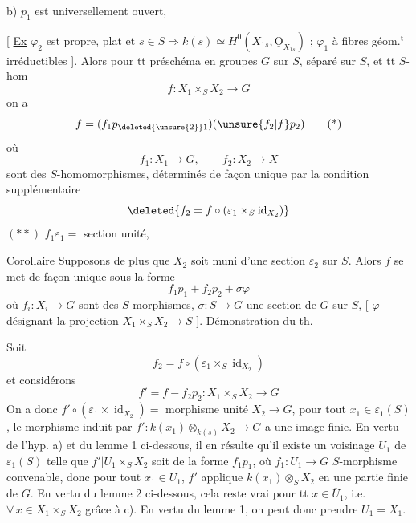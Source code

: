 
 b) $p_1$ est universellement ouvert, 

[ \uline{Ex} $\varphi_2$ est propre, plat et $s\in S\Rightarrow k(s)\simeq H^0(X_{1s},\underline{\mathrm O}_{X_{1s}})$ ;  $\varphi_1$  à fibres géom.$^{\mathrm t}$ irréductibles ]. Alors pour tt préschéma en groupes $G$ sur $S$, séparé sur $S$, et tt $S$-hom
\[
f:X_1\times_S X_2\longrightarrow G
\]
on a
\[
f=(f_1p_{\deleted{\unsure{2}}1})(\unsure{f_2|f}p_2)\tag*{(*)}
\]
où
\[
f_1:X_1\longrightarrow G,\qquad f_2:X_2\longrightarrow X
\]
sont des $S$-homomorphismes, déterminés de façon unique par la condition supplémentaire
\[
\deleted{f_2=f\circ(\varepsilon_1\times_S\operatorname{id}_{X_2})}
\]
\deleted{[ équivaut à :} $(**)$ \quad $f_1\varepsilon_1={}$ section unité, \deleted{pourvu que $\varphi_2$ soit un épim. ]} 

\uline{Corollaire} Supposons de plus que $X_2$ soit muni d'une section $\varepsilon_2$ sur $S$. Alors $f$ se met de façon unique sous la forme
\[
f_1p_1+f_2p_2+\sigma\varphi
\]
 où $f_i:X_i\longrightarrow G$ sont des $S$-morphismes, $\sigma:S\longrightarrow G$ une section de $G$ sur $S$, [ $\varphi$ désignant  la projection $X_1\times_S X_2\longrightarrow S$ ].
Démonstration du th.

Soit
\[
f_2=f\circ(\varepsilon_1\times_S\operatorname{id}_{X_2})
\]
et considérons
\[
f'=f-f_2p_2:X_1\times_S X_2\longrightarrow G
\]
  On a donc $f'\circ(\varepsilon_1\times\operatorname{id}_{X_2})={}$ morphisme unité $X_2\to G$,   pour tout $x_1\in\varepsilon_1(S)$, le morphisme induit par $f':k(x_1)\otimes_{k(s)}X_2\longrightarrow G$  a une image finie. En vertu de l'hyp. a) et du lemme 1 ci-dessous, il en résulte qu'il existe un voisinage $U_1$ de $\varepsilon_1(S)$ telle que $f'|U_1\times_S X_2$ soit de la forme $f_1p_1$, où $f_1:U_1\longrightarrow G$  $S$-morphisme convenable, donc pour tout $x_1\in U_1$, $f'$ applique $k(x_1)\otimes_S X_2$ en une partie finie de $G$. En vertu du lemme 2 ci-dessous,  cela reste vrai pour tt $x\in\overline U_1$, i.e. $\forall\,x\in X_1\times_S X_2$ grâce à c). En vertu du lemme 1, on peut donc prendre $U_1=X_1$.

